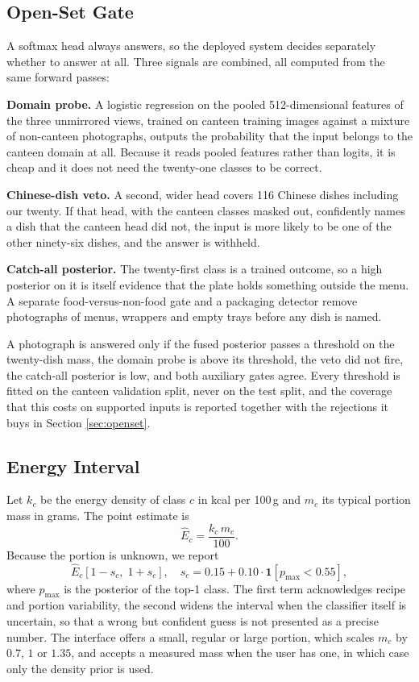 \subsection{Open-Set Gate}
\label{sec:gate}
A softmax head always answers, so the deployed system decides separately whether
to answer at all. Three signals are combined, all computed from the same forward
passes:

\textbf{Domain probe.} A logistic regression on the pooled 512-dimensional
features of the three unmirrored views, trained on canteen training images
against a mixture of non-canteen photographs, outputs the probability that the
input belongs to the canteen domain at all. Because it reads pooled features
rather than logits, it is cheap and it does not need the twenty-one classes to be
correct.

\textbf{Chinese-dish veto.} A second, wider head covers 116 Chinese dishes
including our twenty. If that head, with the canteen classes masked out,
confidently names a dish that the canteen head did not, the input is more likely
to be one of the other ninety-six dishes, and the answer is withheld.

\textbf{Catch-all posterior.} The twenty-first class is a trained outcome, so a
high posterior on it is itself evidence that the plate holds something outside
the menu. A separate food-versus-non-food gate and a packaging detector remove
photographs of menus, wrappers and empty trays before any dish is named.

A photograph is answered only if the fused posterior passes a threshold on the
twenty-dish mass, the domain probe is above its threshold, the veto did not fire,
the catch-all posterior is low, and both auxiliary gates agree. Every threshold
is fitted on the canteen validation split, never on the test split, and the
coverage that this costs on supported inputs is reported together with the
rejections it buys in Section \ref{sec:openset}.

\subsection{Energy Interval}
\label{sec:calorie}
Let $k_c$ be the energy density of class $c$ in kcal per 100\,g and $m_c$ its
typical portion mass in grams. The point estimate is
\begin{equation}
\hat{E}_c = \frac{k_c\, m_c}{100}.
\end{equation}
Because the portion is unknown, we report
\begin{equation}
\hat{E}_c\left[1-s_c,\; 1+s_c\right], \quad
s_c = 0.15+0.10\cdot\mathbf{1}[p_{\max}<0.55],
\label{eq:interval}
\end{equation}
where $p_{\max}$ is the posterior of the top-1 class. The first term
acknowledges recipe and portion variability, the second widens the interval when
the classifier itself is uncertain, so that a wrong but confident guess is not
presented as a precise number. The interface offers a small, regular or large
portion, which scales $m_c$ by $0.7$, $1$ or $1.35$, and accepts a measured mass
when the user has one, in which case only the density prior is used.

